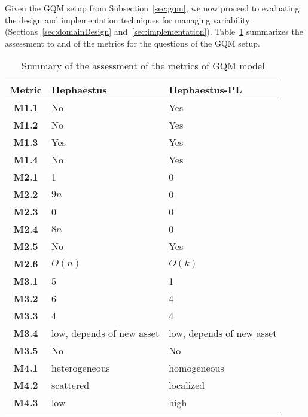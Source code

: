 Given the GQM setup from Subsection~\ref{sec:gqm}, we now proceed to evaluating the design and implementation techniques for managing variability (Sections~\ref{sec:domainDesign} and~\ref{sec:implementation}). Table~\ref{tab:assessment-hpl-hp} summarizes the assessment to \hp{} and \hpl{} of the metrics for the questions of the GQM setup.


\begin{table}[t!]
\begin{center}
\begin{tabular}{||c|| p{5cm} || p{5cm}||}
  \hline
  \textbf{Metric} & \textbf{Hephaestus} & \textbf{Hephaestus-PL}   \\  \hline  \hline 
  \textbf{M1.1} & No  & Yes \\  \hline
  \textbf{M1.2} & No  & Yes \\  \hline
  \textbf{M1.3} & Yes & Yes \\  \hline
  \textbf{M1.4} & No  & Yes \\  \hline \hline   
  \textbf{M2.1} & 1  & 0 \\  \hline
  \textbf{M2.2} & $9n$  & 0 \\  \hline
  \textbf{M2.3} & 0  & 0 \\  \hline
  \textbf{M2.4} & $8n$  & 0 \\  \hline  
  \textbf{M2.5} & No & Yes \\  \hline  
  \textbf{M2.6} & $O(n)$ & $O(k)$ \\  \hline  \hline 
  \textbf{M3.1} & 5  & 1 \\  \hline
  \textbf{M3.2} & 6  & 4 \\  \hline
  \textbf{M3.3} & 4 & 4 \\  \hline
  \textbf{M3.4} & low, depends of new asset &  low, depends of new asset \\  \hline  
  \textbf{M3.5} & No & No \\  \hline \hline 
  \textbf{M4.1} & heterogeneous  & homogeneous \\  \hline
  \textbf{M4.2} & scattered      & localized \\  \hline
  \textbf{M4.3} & low            & high \\  \hline
\hline        
\end{tabular}
\caption{Summary of the assessment of the metrics of GQM model}
\label{tab:assessment-hpl-hp}
\end{center}
\end{table}

